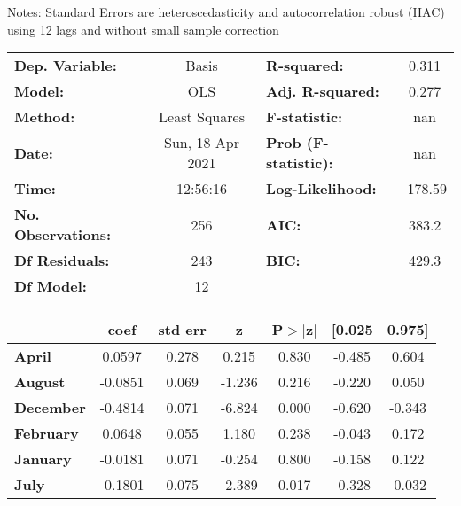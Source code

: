 Notes: \newline
 [1] Standard Errors are heteroscedasticity and autocorrelation robust (HAC) using 12 lags and without small sample correction
\begin{center}
\begin{tabular}{lclc}
\toprule
\textbf{Dep. Variable:}    &      Basis       & \textbf{  R-squared:         } &     0.311   \\
\textbf{Model:}            &       OLS        & \textbf{  Adj. R-squared:    } &     0.277   \\
\textbf{Method:}           &  Least Squares   & \textbf{  F-statistic:       } &       nan   \\
\textbf{Date:}             & Sun, 18 Apr 2021 & \textbf{  Prob (F-statistic):} &      nan    \\
\textbf{Time:}             &     12:56:16     & \textbf{  Log-Likelihood:    } &   -178.59   \\
\textbf{No. Observations:} &         256      & \textbf{  AIC:               } &     383.2   \\
\textbf{Df Residuals:}     &         243      & \textbf{  BIC:               } &     429.3   \\
\textbf{Df Model:}         &          12      & \textbf{                     } &             \\
\bottomrule
\end{tabular}
\begin{tabular}{lcccccc}
                   & \textbf{coef} & \textbf{std err} & \textbf{z} & \textbf{P$> |$z$|$} & \textbf{[0.025} & \textbf{0.975]}  \\
\midrule
\textbf{April}     &       0.0597  &        0.278     &     0.215  &         0.830        &       -0.485    &        0.604     \\
\textbf{August}    &      -0.0851  &        0.069     &    -1.236  &         0.216        &       -0.220    &        0.050     \\
\textbf{December}  &      -0.4814  &        0.071     &    -6.824  &         0.000        &       -0.620    &       -0.343     \\
\textbf{February}  &       0.0648  &        0.055     &     1.180  &         0.238        &       -0.043    &        0.172     \\
\textbf{January}   &      -0.0181  &        0.071     &    -0.254  &         0.800        &       -0.158    &        0.122     \\
\textbf{July}      &      -0.1801  &        0.075     &    -2.389  &         0.017        &       -0.328    &       -0.032     \\

\end{tabular}
\end{center}
